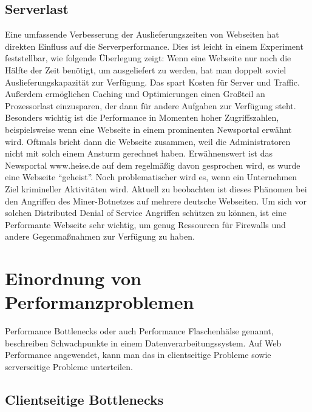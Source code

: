 
\subsection{Serverlast}
Eine umfassende Verbesserung der Auslieferungszeiten von Webseiten hat direkten Einfluss auf die Serverperformance. Dies ist leicht in einem Experiment feststellbar, wie folgende Überlegung zeigt: Wenn eine Webseite nur noch die Hälfte der Zeit benötigt, um ausgeliefert zu werden, hat man doppelt soviel Auslieferungskapazität zur Verfügung. Das spart Kosten für Server und Traffic. Außerdem ermöglichen Caching und Optimierungen einen Großteil an Prozessorlast einzusparen, der dann für andere Aufgaben zur Verfügung steht. Besonders wichtig ist die Performance in Momenten hoher Zugriffszahlen, beispielsweise wenn eine Webseite in einem prominenten Newsportal erwähnt wird. Oftmals bricht dann die Webseite zusammen, weil die Administratoren nicht mit solch einem Ansturm gerechnet haben. Erwähnenswert ist das Newsportal www.heise.de auf dem regelmäßig davon gesprochen wird, es wurde eine Webseite ``geheist''. Noch problematischer wird es, wenn ein Unternehmen Ziel krimineller Aktivitäten wird. Aktuell zu beobachten ist dieses Phänomen bei den Angriffen des Miner-Botnetzes auf mehrere deutsche Webseiten. Um sich vor solchen Distributed Denial of Service Angriffen schützen zu können, ist eine Performante Webseite sehr wichtig, um genug Ressourcen für Firewalls und andere Gegenmaßnahmen zur Verfügung zu haben.


\section{Einordnung von Performanzproblemen}
Performance Bottlenecks oder auch Performance Flaschenhälse genannt, beschreiben Schwachpunkte in einem Datenverarbeitungssystem. Auf Web Performance angewendet, kann man das in clientseitige Probleme sowie serverseitige Probleme unterteilen.

\subsection{Clientseitige Bottlenecks}
